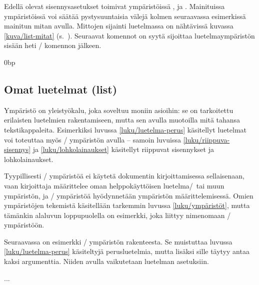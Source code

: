 Edellä olevat sisennysasetukset toimivat ympäristöissä
,  ja .
Mainituissa ympäristöissä voi säätää pystysuuntaisia välejä kolmen
seuraavassa esimerkissä mainitun mitan avulla. Mittojen sijainti
luetelmassa on nähtävissä kuvassa \ref{kuva/list-mitat}
(s.~\pageref{kuva/list-mitat}). Seuraavat komennot on syytä sijoittaa
luetelmaympäristön sisään heti \-/ komennon jälkeen.

\begin{koodilohkosis}
\setlength{\parsep} {0bp}   %
\setlength{\itemsep}{3bp}   %
\setlength{\parskip}{1.2ex} %
\end{koodilohkosis}

\subsection{Omat luetelmat (list)}
\label{luku/list-ympäristö}

Ympäristö  on yleistyökalu, joka soveltuu moniin
asioihin: se on tarkoitettu erilaisten luetelmien rakentamiseen, mutta
sen avulla muotoilla mitä tahansa tekstikappaleita. Esimerkiksi luvussa
\ref{luku/luetelma-perus} käsitellyt luetelmat voi toteuttaa myös
\-/ ympäristön avulla -- samoin luvuissa
\ref{luku/riippuva-sisennys} ja \ref{luku/lohkolainaukset} käsitellyt
riippuvat sisennykset ja lohkolainaukset.

Tyypillisesti \-/ ympäristöä ei käytetä dokumentin
kirjoittamisessa sellaisenaan, vaan kirjoittaja määrittelee oman
helppokäyttöisen luetelma\-/\ tai muun ympäristön, ja
\-/ ympäristöä hyödynnetään ympäristön
määrittelemisessä. Omien ympäristöjen tekemistä käsitellään tarkemmin
luvussa \ref{luku/ympäristöt}, mutta tämänkin alaluvun loppupuolella on
esimerkki, joka liittyy nimenomaan \-/ ympäristöön.

Seuraavassa on esimerkki \-/ ympäristön rakenteesta. Se
muistuttaa luvussa \ref{luku/luetelma-perus} käsiteltyjä perusluetelmia,
mutta lisäksi sille täytyy antaa kaksi argumenttia. Niiden avulla
vaikutetaan luetelman asetuksiin.

\begin{koodilohkosis}
\begin{list}{merkki}{asetukset}
\item ...
\end{list}
\end{koodilohkosis}


